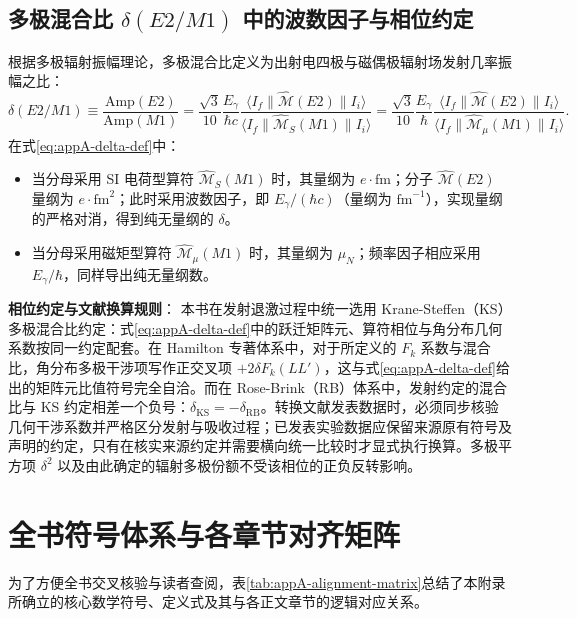 \subsection{多极混合比 $\delta(E2/M1)$ 中的波数因子与相位约定}
根据多极辐射振幅理论，多极混合比定义为出射电四极与磁偶极辐射场发射几率振幅之比：
\begin{equation}\label{eq:appA-delta-def}
\delta(E2/M1) \equiv \frac{\mathrm{Amp}(E2)}{\mathrm{Amp}(M1)} = \frac{\sqrt{3}}{10} \frac{E_\gamma}{\hbar c} \frac{\langle I_f \| \hat{\mathcal{M}}(E2) \| I_i \rangle}{\langle I_f \| \hat{\mathcal{M}}_S(M1) \| I_i \rangle} = \frac{\sqrt{3}}{10} \frac{E_\gamma}{\hbar} \frac{\langle I_f \| \hat{\mathcal{M}}(E2) \| I_i \rangle}{\langle I_f \| \hat{\mathcal{M}}_\mu(M1) \| I_i \rangle} .
\end{equation}
在式\eqref{eq:appA-delta-def}中：
\begin{itemize}
\item 当分母采用 SI 电荷型算符 $\hat{\mathcal{M}}_S(M1)$ 时，其量纲为 $e\cdot\mathrm{fm}$；分子 $\hat{\mathcal{M}}(E2)$ 量纲为 $e\cdot\mathrm{fm}^2$；此时采用波数因子，即 $E_\gamma / (\hbar c)$（量纲为 $\mathrm{fm}^{-1}$），实现量纲的严格对消，得到纯无量纲的 $\delta$。
\item 当分母采用磁矩型算符 $\hat{\mathcal{M}}_\mu(M1)$ 时，其量纲为 $\mu_N$；频率因子相应采用 $E_\gamma / \hbar$，同样导出纯无量纲数。
\end{itemize}

\textbf{相位约定与文献换算规则}：
本书在发射退激过程中统一选用 Krane-Steffen（KS）多极混合比约定：式\eqref{eq:appA-delta-def}中的跃迁矩阵元、算符相位与角分布几何系数按同一约定配套。在 Hamilton 专著体系中，对于所定义的 $F_k$ 系数与混合比，角分布多极干涉项写作正交叉项 $+2\delta F_k(LL')$，这与式\eqref{eq:appA-delta-def}给出的矩阵元比值符号完全自洽。而在 Rose-Brink（RB）体系中，发射约定的混合比与 KS 约定相差一个负号：$\delta_{\mathrm{KS}} = -\delta_{\mathrm{RB}}$。转换文献发表数据时，必须同步核验几何干涉系数并严格区分发射与吸收过程；已发表实验数据应保留来源原有符号及声明的约定，只有在核实来源约定并需要横向统一比较时才显式执行换算。多极平方项 $\delta^2$ 以及由此确定的辐射多极份额不受该相位的正负反转影响。

\section{全书符号体系与各章节对齐矩阵}\label{sec:appA-7}

为了方便全书交叉核验与读者查阅，表\ref{tab:appA-alignment-matrix}总结了本附录所确立的核心数学符号、定义式及其与各正文章节的逻辑对应关系。

